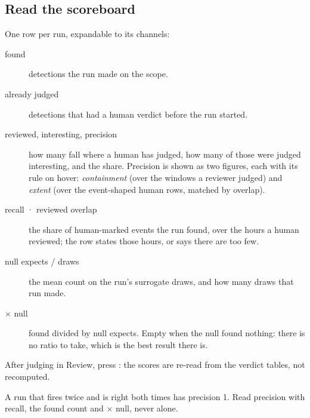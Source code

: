 \subsection*{Read the scoreboard}
One row per run, expandable to its channels:
\begin{description}
  \item[found] detections the run made on the scope.
  \item[already judged] detections that had a human verdict before the run started.
  \item[reviewed, interesting, precision] how many fall where a human has judged, how many of those
        were judged interesting, and the share. Precision is shown as two figures, each with its
        rule on hover: \emph{containment} (over the windows a reviewer judged) and \emph{extent}
        (over the event-shaped human rows, matched by overlap).
  \item[recall · reviewed overlap] the share of human-marked events the run found, over the hours
        a human reviewed; the row states those hours, or says there are too few.
  \item[null expects / draws] the mean count on the run's surrogate draws, and how many draws that
        run made.
  \item[\(\times\) null] found divided by null expects. Empty when the null found nothing: there
        is no ratio to take, which is the best result there is.
\end{description}
After judging in Review, press : the scores are re-read from the
verdict tables, not recomputed.

\begin{watchout}
A run that fires twice and is right both times has precision 1. Read precision with recall, the
found count and \(\times\) null, never alone.
\end{watchout}

